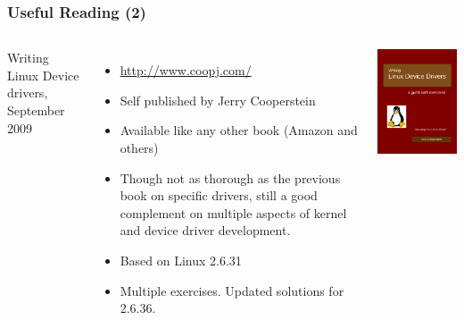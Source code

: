 \begin{frame}
  \frametitle{Useful Reading (2)}
  \begin{columns}
    Writing Linux Device drivers, September 2009
    \begin{itemize}
    \item \url{http://www.coopj.com/}
    \item Self published by Jerry Cooperstein
    \item Available like any other book (Amazon and others)
    \item Though not as thorough as the previous book on specific
      drivers, still a good complement on multiple aspects of kernel
      and device driver development.
    \item Based on Linux 2.6.31
    \item Multiple exercises. Updated solutions for 2.6.36.
    \end{itemize}
    \includegraphics[width=\textwidth]{slides/kernel-resources-references/writing-linux-device-drivers.png}
  \end{columns}
\end{frame}

